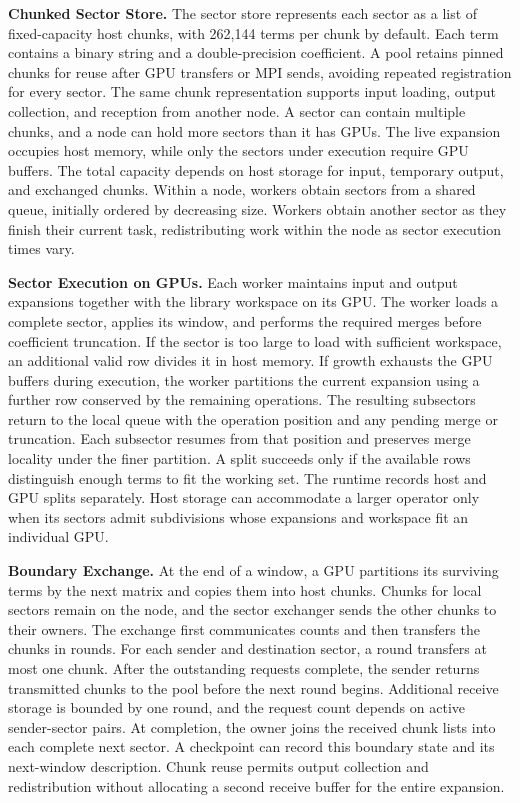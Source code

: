 \noindent\textbf{Chunked Sector Store.}
The sector store represents each sector as a list of fixed-capacity host chunks, with 262,144 terms per chunk by default.
Each term contains a binary string and a double-precision coefficient.
A pool retains pinned chunks for reuse after GPU transfers or MPI sends, avoiding repeated registration for every sector.
The same chunk representation supports input loading, output collection, and reception from another node.
A sector can contain multiple chunks, and a node can hold more sectors than it has GPUs.
The live expansion occupies host memory, while only the sectors under execution require GPU buffers.
The total capacity depends on host storage for input, temporary output, and exchanged chunks.
Within a node, workers obtain sectors from a shared queue, initially ordered by decreasing size.
Workers obtain another sector as they finish their current task, redistributing work within the node as sector execution times vary.

\noindent\textbf{Sector Execution on GPUs.}
Each worker maintains input and output expansions together with the library workspace on its GPU.
The worker loads a complete sector, applies its window, and performs the required merges before coefficient truncation.
If the sector is too large to load with sufficient workspace, an additional valid row divides it in host memory.
If growth exhausts the GPU buffers during execution, the worker partitions the current expansion using a further row conserved by the remaining operations.
The resulting subsectors return to the local queue with the operation position and any pending merge or truncation.
Each subsector resumes from that position and preserves merge locality under the finer partition.
A split succeeds only if the available rows distinguish enough terms to fit the working set.
The runtime records host and GPU splits separately.
Host storage can accommodate a larger operator only when its sectors admit subdivisions whose expansions and workspace fit an individual GPU.

\noindent\textbf{Boundary Exchange.}
At the end of a window, a GPU partitions its surviving terms by the next matrix and copies them into host chunks.
Chunks for local sectors remain on the node, and the sector exchanger sends the other chunks to their owners.
The exchange first communicates counts and then transfers the chunks in rounds.
For each sender and destination sector, a round transfers at most one chunk.
After the outstanding requests complete, the sender returns transmitted chunks to the pool before the next round begins.
Additional receive storage is bounded by one round, and the request count depends on active sender-sector pairs.
At completion, the owner joins the received chunk lists into each complete next sector.
A checkpoint can record this boundary state and its next-window description.
Chunk reuse permits output collection and redistribution without allocating a second receive buffer for the entire expansion.

